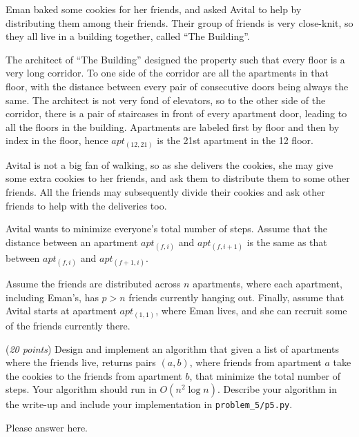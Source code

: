\documentclass{hw}
\begin{document}

\begin{problem}
  Eman baked some cookies for her friends, and asked Avital to help
  by distributing them among their friends. 
  Their group of friends is very close-knit, so they all live in a building 
  together, called ``The Building''.
  
  The architect of ``The Building'' designed 
  the property such that every floor is a very long corridor. To one side of 
  the corridor are all the apartments in that floor, with the distance between 
  every pair of consecutive doors being always the same.   
  The architect is not very fond of elevators, so to the other side of the 
  corridor, there is a pair of staircases in front of every apartment door,
  leading to all the floors in the building. 
  Apartments are labeled first by floor and then by index in the floor, hence 
  $apt_{(12,21)}$ is the 21st apartment in the 12 floor.

  Avital is not a big fan of walking, so as she delivers the cookies,
  she may give some extra cookies to her friends, and ask them to
  distribute them to some other friends. All the friends may subsequently
  divide their cookies and ask other friends to help with the deliveries too. 
  
  Avital wants to minimize everyone's total number of steps. Assume that the distance between an apartment $apt_{(f,i)}$ and $apt_{(f,i+1)}$ is the same as that between $apt_{(f,i)}$ and $apt_{(f+1,i)}$. 
  
  Assume the friends are distributed across $n$ apartments,
  where each apartment, including Eman's, has $p > n$ friends
  currently hanging out.
  Finally, assume that Avital starts at apartment $apt_{(1,1)}$,
  where Eman lives, and she can recruit some of the friends currently there.

  (\textit{20 points}) Design and implement an algorithm that given a list of apartments where the friends live, returns pairs $(a, b)$, where friends from apartment $a$ take the cookies to the friends from apartment $b$, that minimize the total number of steps. Your algorithm should run in $O(n^2 \log n)$.
  Describe your algorithm in the write-up and include your implementation in \texttt{problem\_5/p5.py}.

\begin{solution}
Please answer here.
\end{solution}
\end{problem}
\end{document}
